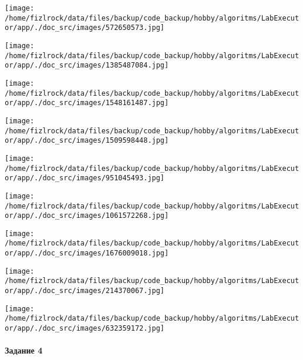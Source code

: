 \documentclass[a4paper, 12pt]{article}
\begin{document}
\texttt{[image: /home/fizlrock/data/files/backup/code\_backup/hobby/algoritms/LabExecutor/app/./doc\_src/images/572650573.jpg]}

\texttt{[image: /home/fizlrock/data/files/backup/code\_backup/hobby/algoritms/LabExecutor/app/./doc\_src/images/1385487084.jpg]}

\texttt{[image: /home/fizlrock/data/files/backup/code\_backup/hobby/algoritms/LabExecutor/app/./doc\_src/images/1548161487.jpg]}

\texttt{[image: /home/fizlrock/data/files/backup/code\_backup/hobby/algoritms/LabExecutor/app/./doc\_src/images/1509598448.jpg]}

\texttt{[image: /home/fizlrock/data/files/backup/code\_backup/hobby/algoritms/LabExecutor/app/./doc\_src/images/951045493.jpg]}

\texttt{[image: /home/fizlrock/data/files/backup/code\_backup/hobby/algoritms/LabExecutor/app/./doc\_src/images/1061572268.jpg]}

\texttt{[image: /home/fizlrock/data/files/backup/code\_backup/hobby/algoritms/LabExecutor/app/./doc\_src/images/1676009018.jpg]}

\texttt{[image: /home/fizlrock/data/files/backup/code\_backup/hobby/algoritms/LabExecutor/app/./doc\_src/images/214370067.jpg]}

\texttt{[image: /home/fizlrock/data/files/backup/code\_backup/hobby/algoritms/LabExecutor/app/./doc\_src/images/632359172.jpg]}
\pagebreak
\paragraph{Задание 4}
\end{document}
